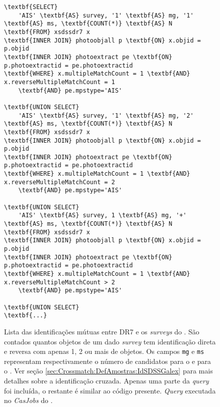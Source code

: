 \begin{figure}
\begin{Verbatim}[commandchars=\\\{\}]
\textbf{SELECT}
	'AIS' \textbf{AS} survey, '1' \textbf{AS} mg, '1' \textbf{AS} ms, \textbf{COUNT(*)} \textbf{AS} N
\textbf{FROM} xsdssdr7 x
\textbf{INNER JOIN} photoobjall p \textbf{ON} x.objid = p.objid 
\textbf{INNER JOIN} photoextract pe \textbf{ON} p.photoextractid = pe.photoextractid
\textbf{WHERE} x.multipleMatchCount = 1 \textbf{AND} x.reverseMultipleMatchCount = 1
	\textbf{AND} pe.mpstype='AIS'

\textbf{UNION SELECT}
	'AIS' \textbf{AS} survey, '1' \textbf{AS} mg, '2' \textbf{AS} ms, \textbf{COUNT(*)} \textbf{AS} N
\textbf{FROM} xsdssdr7 x
\textbf{INNER JOIN} photoobjall p \textbf{ON} x.objid = p.objid 
\textbf{INNER JOIN} photoextract pe \textbf{ON} p.photoextractid = pe.photoextractid
\textbf{WHERE} x.multipleMatchCount = 1 \textbf{AND} x.reverseMultipleMatchCount = 2
	\textbf{AND} pe.mpstype='AIS'

\textbf{UNION SELECT}
	'AIS' \textbf{AS} survey, 1 \textbf{AS} mg, '+' \textbf{AS} ms, \textbf{COUNT(*)} \textbf{AS} N
\textbf{FROM} xsdssdr7 x
\textbf{INNER JOIN} photoobjall p \textbf{ON} x.objid = p.objid 
\textbf{INNER JOIN} photoextract pe \textbf{ON} p.photoextractid = pe.photoextractid
\textbf{WHERE} x.multipleMatchCount = 1 \textbf{AND} x.reverseMultipleMatchCount > 2
	\textbf{AND} pe.mpstype='AIS'

\textbf{UNION SELECT}
\textbf{...}
\end{Verbatim}
	\caption[{\em Query} listando identificações entre \SDSS e {\em surveys} do
	\galex.] {Lista das identificações mútuas entre \SDSS DR7 e os {\em surveys}
	do \galex. São contados quantos objetos de um dado {\em survey} tem
	identificação direta e reversa com apenas 1, 2 ou mais de objetos. Os campos
	\texttt{mg} e \texttt{ms} representam respectivamente o número de candidatos
	para o \galex e para o \SDSS. Ver seção
	\ref{sec:Crossmatch:DefAmostras:IdSDSSGalex} para mais detalhes sobre a
	identificação cruzada. Apenas uma parte da {\em query} foi incluída, o
	restante é similar ao código presente. {\em Query} executada no {\em CasJobs}
	do \galex.}
	\label{fig:QueryIDGalexSDSS}
\end{figure}


